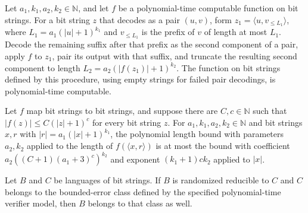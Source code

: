 \begin{theorem}
\label{Randomized.polyTimeComputable_composeMap}
\leanok
{}
Let $a_1,k_1,a_2,k_2\in\mathbb{N}$, and let $f$ be a polynomial-time computable function
on bit strings. For a bit string $z$ that decodes as a pair $(u,v)$, form $z_1=\langle
u, v_{\le L_1}\rangle$, where $L_1=a_1(|u|+1)^{k_1}$ and $v_{\le L_1}$ is the prefix of
$v$ of length at most $L_1$. Decode the remaining suffix after that prefix as the second
component of a pair, apply $f$ to $z_1$, pair its output with that suffix, and truncate
the resulting second component to length $L_2=a_2(|f(z_1)|+1)^{k_2}$. The function on
bit strings defined by this procedure, using empty strings for failed pair decodings, is
polynomial-time computable.
\end{theorem}

\begin{theorem}
\label{Randomized.polyLen_length_pairEncode_le}
\leanok
{}
Let $f$ map bit strings to bit strings, and suppose there are $C,c\in\mathbb{N}$ such
that $|f(z)|\le C(|z|+1)^c$ for every bit string $z$. For $a_1,k_1,a_2,k_2\in\mathbb{N}$
and bit strings $x,r$ with $|r|=a_1(|x|+1)^{k_1}$, the polynomial length bound with
parameters $a_2,k_2$ applied to the length of $f(\langle x,r\rangle)$ is at most the
bound with coefficient $a_2((C+1)(a_1+3)^c)^{k_2}$ and exponent $(k_1+1)ck_2$ applied to
$|x|$.
\end{theorem}

\begin{theorem}
\label{Randomized.InBPP.of_randReducible}
\leanok
{}
Let $B$ and $C$ be languages of bit strings. If $B$ is randomized reducible to $C$ and
$C$ belongs to the bounded-error class defined by the specified polynomial-time verifier
model, then $B$ belongs to that class as well.
\end{theorem}


